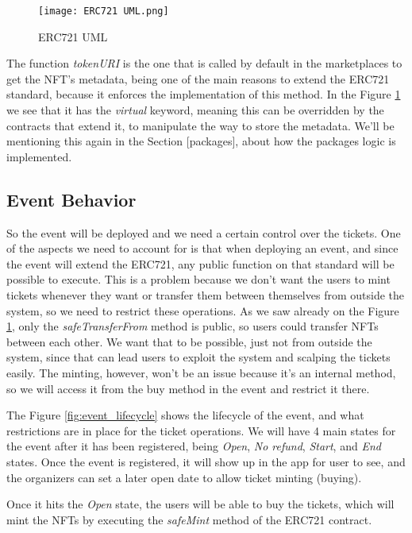 \begin{figure}[H]
    \texttt{[image: ERC721 UML.png]}
    \centering
    \caption{ERC721 UML}
    \label{fig:erc721_uml}
\end{figure}

The function \textit{tokenURI} is the one that is called by default in the marketplaces to get the NFT's metadata, being one of the main reasons to extend the ERC721 standard, because it enforces the implementation of this method. In the Figure \ref{fig:erc721_uml} we see that it has the \textit{virtual} keyword, meaning this can be overridden by the contracts that extend it, to manipulate the way to store the metadata. We'll be mentioning this again in the Section [packages], about how the packages logic is implemented.

\subsection{Event Behavior}
\label{subsec:event_behavior}

So the event will be deployed and we need a certain control over the tickets. One of the aspects we need to account for is that when deploying an event, and since the event will extend the ERC721, any public function on that standard will be possible to execute. This is a problem because we don't want the users to mint tickets whenever they want or transfer them between themselves from outside the system, so we need to restrict these operations. As we saw already on the Figure \ref{fig:erc721_uml}, only the \textit{safeTransferFrom} method is public, so users could transfer NFTs between each other. We want that to be possible, just not from outside the system, since that can lead users to exploit the system and scalping the tickets easily. The minting, however, won't be an issue because it's an internal method, so we will access it from the buy method in the event and restrict it there.

The Figure \ref{fig:event_lifecycle} shows the lifecycle of the event, and what restrictions are in place for the ticket operations. We will have 4 main states for the event after it has been registered, being \textit{Open}, \textit{No refund}, \textit{Start}, and \textit{End} states. Once the event is registered, it will show up in the app for user to see, and the organizers can set a later open date to allow ticket minting (buying).

Once it hits the \textit{Open} state, the users will be able to buy the tickets, which will mint the NFTs by executing the \textit{safeMint} method of the ERC721 contract.

